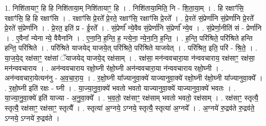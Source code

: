 \documentclass[17pt]{extarticle}
\begin{document}
1. निशि॑तायाꣳ॒॒ हि हि निशि॑ताया॒म् निशि॑तायाꣳ॒॒ हि । . निशि॑ताया॒मिति॒ नि - शि॒ता॒या॒म् । . हि रक्षाꣳ॑सि॒ रक्षाꣳ॑सि॒ हि हि रक्षाꣳ॑सि । . रक्षाꣳ॑सि प्रे॒रते᳚ प्रे॒रते॒ रक्षाꣳ॑सि॒ रक्षाꣳ॑सि प्रे॒रते᳚ । . प्रे॒रते॑ सं॒प्रेर्णा॑नि सं॒प्रेर्णा॑नि प्रे॒रते᳚ प्रे॒रते॑ सं॒प्रेर्णा॑नि । . प्रे॒रत॒ इति॑ प्र - ई॒रते᳚ । . सं॒प्रेर्णा᳚ न्ये॒वैव सं॒प्रेर्णा॑नि सं॒प्रेर्णा᳚ न्ये॒व । . सं॒प्रेर्णा॒नीति॑ सं - प्रेर्णा॑नि । . ए॒वैना᳚ न्येना न्ये॒ वैवैना॑नि । . ए॒ना॒नि॒ ह॒न्ति॒ ह॒ न्त्ये॒ना॒ न्ये॒ना॒नि॒ ह॒न्ति॒ । . ह॒न्ति॒ परि॑श्रिते॒ परि॑श्रिते हन्ति हन्ति॒ परि॑श्रिते । . परि॑श्रिते याजयेद् याजये॒त् परि॑श्रिते॒ परि॑श्रिते याजयेत् । . परि॑श्रित॒ इति॒ परि॑ - श्रि॒ते॒ । . या॒ज॒ये॒द् रक्ष॑साꣳ॒॒ रक्ष॑सां ॅयाजयेद् याजये॒द् रक्ष॑साम् । . रक्ष॑सा॒ मन॑न्ववचारा॒या न॑न्ववचाराय॒ रक्ष॑साꣳ॒॒ रक्ष॑सा॒ मन॑न्ववचाराय । . अन॑न्ववचाराय रक्षो॒घ्नी र॑क्षो॒घ्नी अन॑न्ववचारा॒या न॑न्ववचाराय रक्षो॒घ्नी । . अन॑न्ववचारा॒येत्यन॑नु - अ॒व॒चा॒रा॒य॒ । . र॒क्षो॒घ्नी या᳚ज्यानुवा॒क्ये॑ याज्यानुवा॒क्ये॑ रक्षो॒घ्नी र॑क्षो॒घ्नी या᳚ज्यानुवा॒क्ये᳚ । . र॒क्षो॒घ्नी इति॑ रक्षः - घ्नी । . या॒ज्या॒नु॒वा॒क्ये॑ भवतो भवतो याज्यानुवा॒क्ये॑ याज्यानुवा॒क्ये॑ भवतः । . या॒ज्या॒नु॒वा॒क्ये॑ इति॑ याज्या - अ॒नु॒वा॒क्ये᳚ । . भ॒व॒तो॒ रक्ष॑साꣳ॒॒ रक्ष॑साम् भवतो भवतो॒ रक्ष॑साम् । . रक्ष॑साꣳ॒॒ स्तृत्यै॒ स्तृत्यै॒ रक्ष॑साꣳ॒॒ रक्ष॑साꣳ॒॒ स्तृत्यै᳚ । . स्तृत्या॑ अ॒ग्नये॒ ऽग्नये॒ स्तृत्यै॒ स्तृत्या॑ अ॒ग्नये᳚ । . अ॒ग्नये॑ रु॒द्रव॑ते रु॒द्रव॑ते॒ ऽग्नये॒ ऽग्नये॑ रु॒द्रव॑ते । \newline
\end{document}
